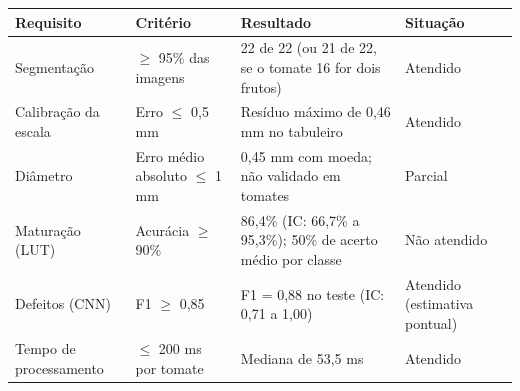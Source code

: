 \begin{quadro}[htb]
	\centering
	\caption{\label{qua:criterios}Resultados em relação aos critérios de aceitação.}
	\begin{tabular}{|p{3.3cm}|p{3.0cm}|p{4.6cm}|p{3.0cm}|}
		\hline
		\textbf{Requisito} & \textbf{Critério} & \textbf{Resultado} & \textbf{Situação} \\
		\hline
		Segmentação & $\geq$ 95\% das imagens & 22 de 22 (ou 21 de 22, se o tomate 16 for dois frutos) & Atendido \\
		\hline
		Calibração da escala & Erro $\leq$ 0,5 mm & Resíduo máximo de 0,46 mm no tabuleiro & Atendido \\
		\hline
		Diâmetro & Erro médio absoluto $\leq$ 1 mm & 0,45 mm com moeda; não validado em tomates & Parcial \\
		\hline
		Maturação (LUT) & Acurácia $\geq$ 90\% & 86,4\% (IC: 66,7\% a 95,3\%); 50\% de acerto médio por classe & Não atendido \\
		\hline
		Defeitos (CNN) & F1 $\geq$ 0,85 & F1 = 0,88 no teste (IC: 0,71 a 1,00) & Atendido (estimativa pontual) \\
		\hline
		Tempo de processamento & $\leq$ 200 ms por tomate & Mediana de 53,5 ms & Atendido \\
		\hline
	\end{tabular}
\end{quadro}

